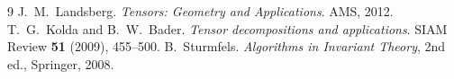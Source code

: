 \documentclass[11pt]{article}
\begin{document}
\begin{thebibliography}{9}
 J.~M.~Landsberg.
  \emph{Tensors: Geometry and Applications}. AMS, 2012.
 T.~G.~Kolda and B.~W.~Bader.
  \emph{Tensor decompositions and applications}.
  SIAM Review \textbf{51} (2009), 455--500.
 B.~Sturmfels.
  \emph{Algorithms in Invariant Theory}, 2nd ed., Springer, 2008.
\end{thebibliography}
\end{document}
